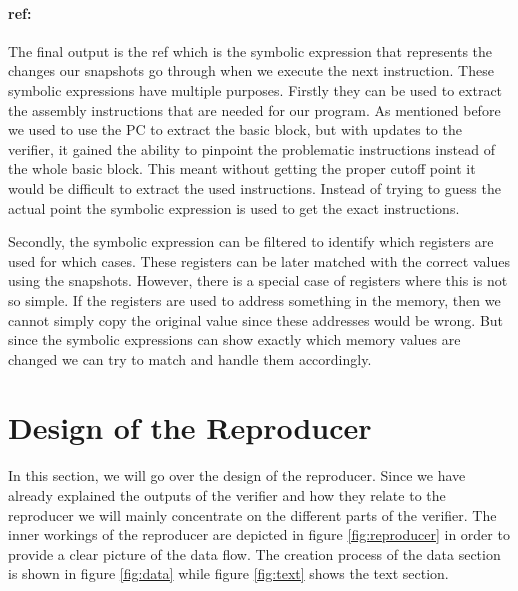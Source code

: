 \paragraph{ref:}
The final output is the ref which is the symbolic expression that represents the changes our snapshots go through when we execute the next instruction.
These symbolic expressions have multiple purposes.
Firstly they can be used to extract the assembly instructions that are needed for our program.
As mentioned before we used to use the PC to extract the basic block, but with updates to the verifier, it gained the ability to pinpoint the problematic instructions instead of the whole basic block.
This meant without getting the proper cutoff point it would be difficult to extract the used instructions.
Instead of trying to guess the actual point the symbolic expression is used to get the exact instructions.

Secondly, the symbolic expression can be filtered to identify which registers are used for which cases.
These registers can be later matched with the correct values using the snapshots.
However, there is a special case of registers where this is not so simple.
If the registers are used to address something in the memory, then we cannot simply copy the original value since these addresses would be wrong.
But since the symbolic expressions can show exactly which memory values are changed we can try to match and handle them accordingly.

\section{Design of the Reproducer}
In this section, we will go over the design of the reproducer.
Since we have already explained the outputs of the verifier and how they relate to the reproducer we will mainly concentrate on the different parts of the verifier.
The inner workings of the reproducer are depicted in figure \ref{fig:reproducer} in order to provide a clear picture of the data flow.
The creation process of the data section is shown in figure \ref{fig:data} while figure \ref{fig:text} shows the text section.

